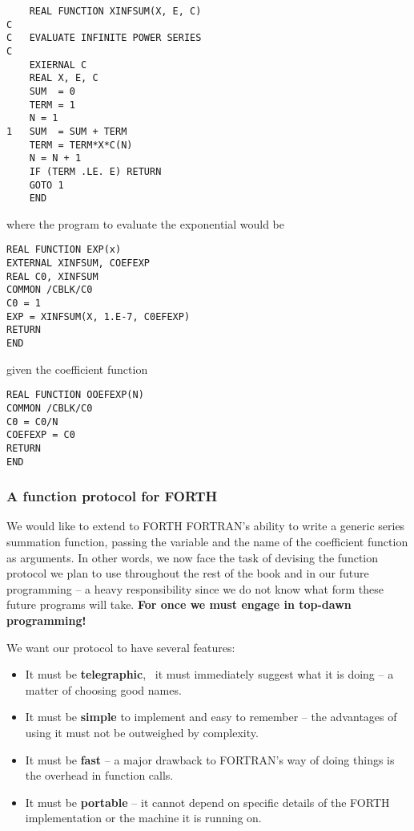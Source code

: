 \begin{lstlisting}
    REAL FUNCTION XINFSUM(X, E, C)
C
C   EVALUATE INFINITE POWER SERIES
C
    EXIERNAL C
    REAL X, E, C
    SUM  = 0
    TERM = 1
    N = 1
1   SUM  = SUM + TERM
    TERM = TERM*X*C(N)
    N = N + 1
    IF (TERM .LE. E) RETURN
    GOTO 1
    END
\end{lstlisting}

where the program to evaluate the exponential would be

\begin{lstlisting}
REAL FUNCTION EXP(x)
EXTERNAL XINFSUM, COEFEXP
REAL C0, XINFSUM
COMMON /CBLK/C0
C0 = 1
EXP = XINFSUM(X, 1.E-7, C0EFEXP)
RETURN
END
\end{lstlisting}

given the coefficient function

\begin{lstlisting}
REAL FUNCTION OOEFEXP(N)
COMMON /CBLK/C0
C0 = C0/N
COEFEXP = C0
RETURN
END
\end{lstlisting}

\subsubsection{A function protocol for FORTH}\label{chap:06_03_02}

We would like to extend to FORTH FORTRAN's ability to write a generic series summation function, passing the variable and the name of the coefficient function as arguments. In other words, we now face the task of devising the function protocol we plan to use throughout the rest of the book and in our future programming -- a heavy responsibility since we do not know what form these future programs will take. \textbf{For once we must engage in top-dawn programming!}

We want our protocol to have several features:
\begin{itemize}
    \item It must be \textbf{telegraphic}, \ie\ it must immediately suggest what it is doing -- a matter of choosing good names.
    \item It must be \textbf{simple} to implement and easy to remember -- the advantages of using it must not be outweighed by complexity.
    \item It must be \textbf{fast} -- a major drawback to FORTRAN's way of doing things is the overhead in function calls.
    \item It must be \textbf{portable} -- it cannot depend on specific details of the FORTH implementation or the machine it is running on.
\end{itemize}

